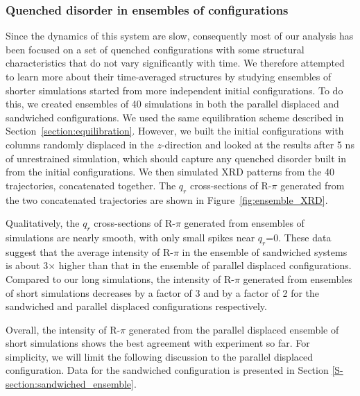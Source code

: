 \documentclass[journal=jpcbfk,manuscript=article]{achemso}
\begin{document}
  \subsubsection*{Quenched disorder in ensembles of configurations}  

  Since the dynamics of this system are slow, consequently most of our analysis
  has been focused on a set of quenched configurations with some structural
  characteristics that do not vary significantly with time. We therefore
  attempted to learn more about their time-averaged structures by studying
  ensembles of shorter simulations started from more independent initial
  configurations. To do this, we created ensembles of 40 simulations in both the
  parallel displaced and sandwiched configurations. We used the same
  equilibration scheme described in Section~\ref{section:equilibration}.
  However, we built the initial configurations with columns randomly displaced in
  the $z$-direction and looked at the results after 5 ns of unrestrained
  simulation, which should capture any quenched disorder built in from the
  initial configurations. We then simulated XRD patterns from the 40
  trajectories, concatenated together. The $q_r$ cross-sections of R-$\pi$
  generated from the two concatenated trajectories are shown in
  Figure~\ref{fig:ensemble_XRD}. 
  
  Qualitatively, the $q_r$ cross-sections of R-$\pi$ generated from ensembles of
  simulations are nearly smooth, with only small spikes near $q_r$=0. These data
  suggest that the average intensity of R-$\pi$ in the ensemble of sandwiched 
  systems is about 3$\times$ higher than that in the ensemble of parallel displaced
  configurations. Compared to our long simulations, the intensity of R-$\pi$
  generated from ensembles of short simulations decreases by a factor of 3
  and by a factor of 2 for the sandwiched and parallel displaced configurations respectively. 

  Overall, the intensity of R-$\pi$ generated from the parallel displaced 
  ensemble of short simulations shows the best agreement with experiment so far. For simplicity, 
  we will limit the following discussion to the parallel displaced configuration.
  Data for the sandwiched configuration is presented in Section 
  \ref{S-section:sandwiched_ensemble}.
\end{document}
